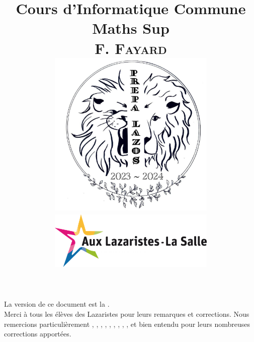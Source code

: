 \documentclass[book]{magnolia}
\title{{\Huge\bf Cours d'Informatique Commune}\\\vspace{1cm}
       \textbf{\Huge Maths Sup}\\\vspace{1cm}
       \textsc{F. Fayard}\\\vspace{1cm}
       \includegraphics[width=8cm]{../../Commun/Images/lazos-bde-2024.png}\\%
       \includegraphics[width=8cm]{../../Commun/Images/lazos.png}}
\begin{document}
\maketitle

La version de ce document est la \textsc{\GITAbrHash}.\\


Merci à tous les élèves des Lazaristes pour leurs remarques et corrections. Nous remercions particulièrement
, , , , , , , , ,  et bien entendu  pour leurs
nombreuses corrections apportées.\\

\vfill
\end{document}
